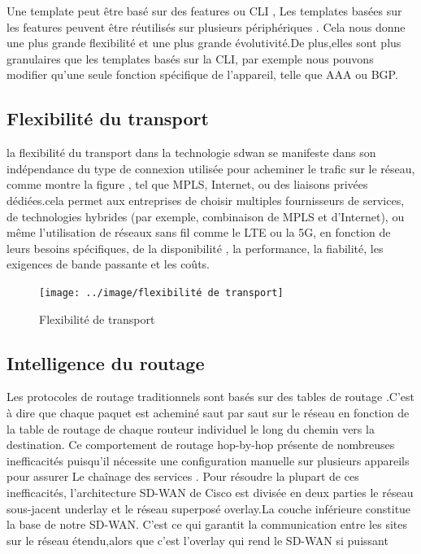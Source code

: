 Une template peut être basé sur des features ou CLI , Les templates basées sur  les features peuvent être réutilisés sur plusieurs périphériques . Cela nous donne une plus grande flexibilité et une plus grande évolutivité.De plus,elles sont plus granulaires que les templates basés sur la CLI, par exemple nous pouvons  modifier qu'une seule fonction spécifique de l'appareil, telle que AAA ou BGP.
\subsection{Flexibilité du transport  }

la flexibilité du transport dans la technologie sdwan se manifeste dans son indépendance du type de connexion utilisée pour acheminer le trafic sur le réseau, comme montre la figure   , tel que MPLS, Internet, ou des liaisons privées dédiées.cela permet aux entreprises de choisir multiples fournisseurs de services, de technologies hybrides (par exemple, combinaison de MPLS et d'Internet), ou même l'utilisation de réseaux sans fil comme le LTE ou la 5G, en fonction de leurs besoins spécifiques, de la disponibilité , la performance, la fiabilité, les exigences de bande passante et les coûts.
	\begin{figure} [H]
	\begin{center}
		\centering
		\hspace*{-0.5cm}
	\texttt{[image: ../image/flexibilité de transport]}
	\end{center}
	\caption{Flexibilité de transport}
\end{figure} 




\subsection{Intelligence du routage   }

Les protocoles de routage traditionnels sont basés sur des tables de routage .C’est à dire  que chaque paquet est acheminé saut par saut sur le réseau en fonction de la table de routage de chaque routeur individuel le long du chemin vers la destination. Ce comportement de routage hop-by-hop présente de nombreuses inefficacités  puisqu'il nécessite une configuration manuelle sur plusieurs appareils pour assurer Le chaînage des services .
Pour résoudre la plupart de ces inefficacités, l'architecture SD-WAN de Cisco est divisée en deux parties le réseau sous-jacent underlay et le réseau superposé overlay.La couche inférieure constitue la base de notre SD-WAN. C'est ce qui garantit la communication entre les sites sur le réseau étendu,alors que  c'est l'overlay qui rend le SD-WAN si puissant 



